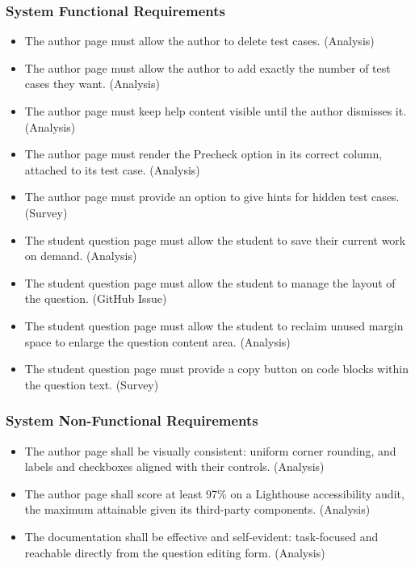 \subsubsection{System Functional Requirements}
\begin{itemize}
  \item[\textbf{FR1}] The author page must allow the author to delete test cases. (Analysis)
  \item[\textbf{FR2}] The author page must allow the author to add exactly the number of test cases they want. (Analysis)
  \item[\textbf{FR3}] The author page must keep help content visible until the author dismisses it. (Analysis)
  \item[\textbf{FR4}] The author page must render the Precheck option in its correct column, attached to its test case. (Analysis)
  \item[\textbf{FR5}] The author page must provide an option to give hints for hidden test cases. (Survey)
  \item[\textbf{FR6}] The student question page must allow the student to save their current work on demand. (Analysis)
  \item[\textbf{FR7}] The student question page must allow the student to manage the layout of the question. (GitHub Issue)
  \item[\textbf{FR8}] The student question page must allow the student to reclaim unused margin space to enlarge the question content area. (Analysis)
  \item[\textbf{FR9}] The student question page must provide a copy button on code blocks within the question text. (Survey)
\end{itemize}

\subsubsection{System Non-Functional Requirements}

\begin{itemize}
    \item[\textbf{NFR1}] The author page shall be visually consistent: uniform corner rounding, and labels and checkboxes aligned with their controls. (Analysis)
    \item[\textbf{NFR2}] The author page shall score at least 97\% on a Lighthouse accessibility audit, the maximum attainable given its third-party components. (Analysis)
    \item[\textbf{NFR3}] The documentation shall be effective and self-evident: task-focused and reachable directly from the question editing form. (Analysis)
\end{itemize}

